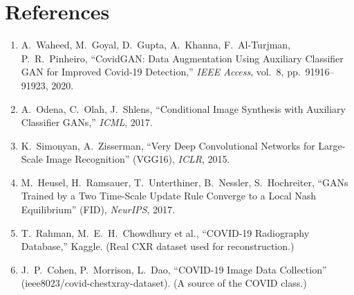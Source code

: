 \documentclass[11pt]{article}
\begin{document}
\section{References}
\begin{enumerate}[nosep,leftmargin=1.6em]
  \item A.~Waheed, M.~Goyal, D.~Gupta, A.~Khanna, F.~Al-Turjman, P.~R.~Pinheiro,
        ``CovidGAN: Data Augmentation Using Auxiliary Classifier GAN for Improved
        Covid-19 Detection,'' \emph{IEEE Access}, vol.~8, pp.~91916--91923, 2020.
  \item A.~Odena, C.~Olah, J.~Shlens, ``Conditional Image Synthesis with Auxiliary
        Classifier GANs,'' \emph{ICML}, 2017.
  \item K.~Simonyan, A.~Zisserman, ``Very Deep Convolutional Networks for
        Large-Scale Image Recognition'' (VGG16), \emph{ICLR}, 2015.
  \item M.~Heusel, H.~Ramsauer, T.~Unterthiner, B.~Nessler, S.~Hochreiter, ``GANs
        Trained by a Two Time-Scale Update Rule Converge to a Local Nash
        Equilibrium'' (FID), \emph{NeurIPS}, 2017.
  \item T.~Rahman, M.~E.~H.~Chowdhury et al., ``COVID-19 Radiography Database,''
        Kaggle. (Real CXR dataset used for reconstruction.)
  \item J.~P.~Cohen, P.~Morrison, L.~Dao, ``COVID-19 Image Data Collection''
        (ieee8023/covid-chestxray-dataset). (A source of the COVID class.)
\end{enumerate}
\end{document}
